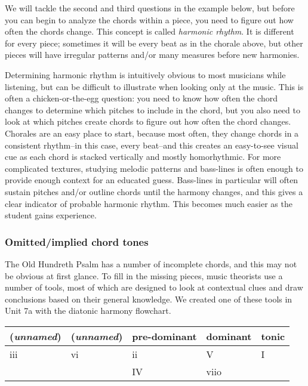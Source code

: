 \documentclass{book}
\begin{document}
We will tackle the second and third questions in the example below, but before
you can begin to analyze the chords within a piece, you need to figure out how
often the chords change. This concept is called \emph{harmonic rhythm}. It is
different for every piece; sometimes it will be every beat as in the chorale
above, but other pieces will have irregular patterns and/or many measures
before new harmonies.

Determining harmonic rhythm is intuitively obvious to most musicians while
listening, but can be difficult to illustrate when looking only at the music.
This is often a chicken-or-the-egg question: you need to know how often the
chord changes to determine which pitches to include in the chord, but you also
need to look at which pitches create chords to figure out how often the chord
changes. Chorales are an easy place to start, because most often, they change
chords in a consistent rhythm--in this case, every beat--and this creates an
easy-to-see visual cue as each chord is stacked vertically and mostly
homorhythmic. For more complicated textures, studying melodic patterns and
bass-lines is often enough to provide enough context for an educated guess.
Bass-lines in particular will often sustain pitches and/or outline chords
until the harmony changes, and this gives a clear indicator of probable
harmonic rhythm. This becomes much easier as the student gains experience.

\hypertarget{omittedimplied-chord-tones}{%
\subsubsection{Omitted/implied chord tones}\label{omittedimplied-chord-tones}}

The Old Hundreth Psalm has a number of incomplete chords, and this may not be
obvious at first glance. To fill in the missing pieces, music theorists use a
number of tools, most of which are designed to look at contextual clues and
draw conclusions based on their general knowledge. We created one of these
tools in Unit 7a with the diatonic harmony flowchart.

\begin{longtable}[]{@{}lllll@{}}
\toprule
(\emph{unnamed}) & (\emph{unnamed}) & pre-dominant & dominant & tonic \\
\midrule
\endhead
iii & vi & ii & V & I \\
& & IV & viio & \\
\bottomrule
\end{longtable}
\end{document}
